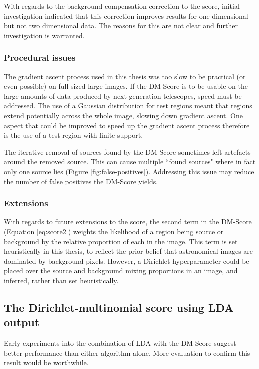 With regards to the background compensation correction to the score, initial investigation indicated that this correction improves results for one dimensional but not two dimensional data. The reasons for this are not clear and further investigation is warranted.

\subsubsection{Procedural issues}

The gradient ascent process used in this thesis was too slow to be practical (or even possible) on full-sized large images. If the DM-Score is to be usable on the large amounts of data produced by next generation telescopes, speed must be addressed. The use of a Gaussian distribution for test regions meant that regions extend potentially across the whole image, slowing down gradient ascent. One aspect that could be improved to speed up the gradient ascent process therefore is the use of a test region with finite support. 

The iterative removal of sources found by the DM-Score sometimes left artefacts around the removed source. This can cause multiple ``found sources" where in fact only one source lies (Figure \ref{fig:false-positives}). Addressing this issue may reduce the number of false positives the DM-Score yields.

\subsubsection{Extensions}

With regards to future extensions to the score, the second term in the DM-Score (Equation \ref{eq:score2}) weights the likelihood of a region being source or background by the relative proportion of each in the image. This term is set heuristically in this thesis, to reflect the prior belief that astronomical images are dominated by background pixels. However, a Dirichlet hyperparameter could be placed over the source and background mixing proportions in an image, and inferred, rather than set heuristically.

\subsection{The Dirichlet-multinomial score using LDA output}

Early experiments into the combination of LDA with the DM-Score suggest better performance than either algorithm alone. More evaluation to confirm this result would be worthwhile. 

